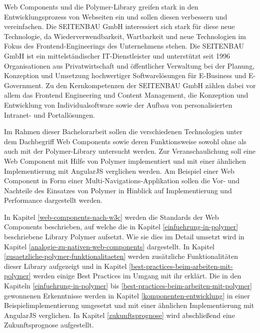 Web Components und die Polymer-Library greifen stark in den Entwicklungsprozess von Webseiten ein und sollen diesen verbessern und vereinfachen. Die SEITENBAU GmbH interessiert sich stark für diese neue Technologie, da Wiederverwendbarkeit, Wartbarkeit und neue Technologien im Fokus des Frontend-Engineerings des Unternehmens stehen.
Die SEITENBAU GmbH ist ein mittelständischer IT-Dienstleister und unterstützt seit 1996 Organisationen aus Privatwirtschaft und öffentlicher Verwaltung bei der Planung, Konzeption und Umsetzung hochwertiger Softwarelösungen für E-Business und E-Government. Zu den Kernkompetenzen der SEITENBAU GmbH zählen dabei vor allem das Frontend Engineering und Content Management, die Konzeption und Entwicklung von Individualsoftware sowie der Aufbau von personalisierten Intranet- und Portallösungen.

Im Rahmen dieser Bachelorarbeit sollen die verschiedenen Technologien unter dem Dachbegriff Web Components sowie deren Funktionsweise sowohl ohne als auch mit der Polymer-Library untersucht werden. Zur Veranschaulichung soll eine Web Component mit Hilfe von Polymer implementiert und mit einer ähnlichen Implementierung mit AngularJS verglichen werden. Am Beispiel einer Web Component in Form einer Multi-Navigations-Applikation sollen die Vor- und Nachteile des Einsatzes von Polymer in Hinblick auf Implementierung und Performance dargestellt werden.

In Kapitel \ref{web-components-nach-w3c} werden die Standards der Web Components beschrieben, auf welche die in Kapitel \ref{einfuehrung-in-polymer} beschriebene Library Polymer aufsetzt. Wie sie dies im Detail umsetzt wird in Kapitel \ref{analogie-zu-nativen-web-components} dargestellt. In Kapitel \ref{zusaetzliche-polymer-funktionalitaeten} werden zusätzliche Funktionalitäten dieser Library aufgezeigt und in Kapitel \ref{best-practices-beim-arbeiten-mit-polymer} werden einige Best Practices im Umgang mit ihr erklärt. Die in den Kapiteln \ref{einfuehrung-in-polymer} bis \ref{best-practices-beim-arbeiten-mit-polymer} gewonnenen Erkenntnisse werden in Kapitel \ref{komponenten-entwicklung} in einer Beispielimplementierung umgesetzt und mit einer ähnlichen Implementierung mit AngularJS verglichen. In Kapitel \ref{zukunftsprognose} wird abschließend eine Zukunftsprognose aufgestellt.
